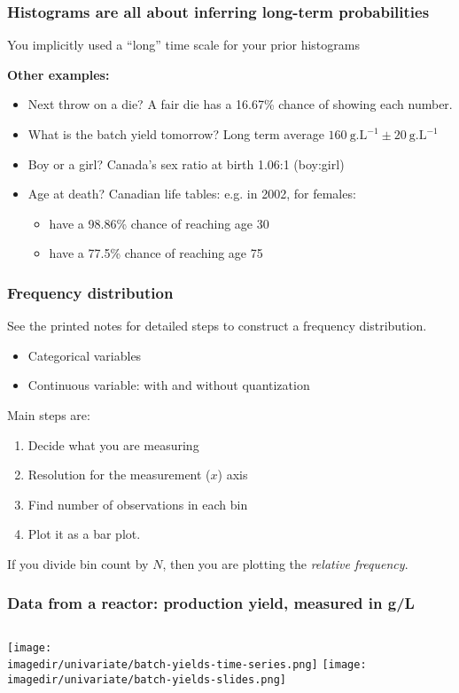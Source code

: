 \begin{frame}\frametitle{Histograms are all about inferring long-term probabilities}
	You implicitly used a ``long'' time scale for your prior histograms

	\vspace{12pt}
	\textbf{Other examples:}
	\begin{itemize}
		\item	Next throw on a die? A fair die has a 16.67\% chance of showing each number.
		\item	What is the batch yield tomorrow? Long term average $160~\text{g.L}^{-1} \pm 20~\text{g.L}^{-1}$
		\item	Boy or a girl? Canada's sex ratio at birth 1.06:1 (boy:girl)
		\item	Age at death? Canadian life tables: e.g. in 2002, for females:
		\begin{itemize}
			\item	have a 98.86\% chance of reaching age 30
			\item	have a 77.5\% chance of reaching age 75
		\end{itemize}
	\end{itemize}
\end{frame}

\begin{frame}\frametitle{Frequency distribution}

	See the printed notes for detailed steps to construct a frequency distribution.
	\begin{itemize}
		\item	Categorical variables
		\item	Continuous variable: with and without quantization
	\end{itemize}

	Main steps are:
	\begin{enumerate}
		\item	Decide what you are measuring
		\item	Resolution for the measurement ($x$) axis
		\item	Find number of observations in each bin
		\item	Plot it as a bar plot.
	\end{enumerate}

	If you divide bin count by $N$, then you are plotting the \emph{relative frequency}.
\end{frame}

\begin{frame}\frametitle{Data from a reactor: production yield, measured in g/L}
	\begin{columns}
			\texttt{[image: \\imagedir/univariate/batch-yields-time-series.png]}
			\texttt{[image: \\imagedir/univariate/batch-yields-slides.png]}
	\end{columns}
\end{frame}

